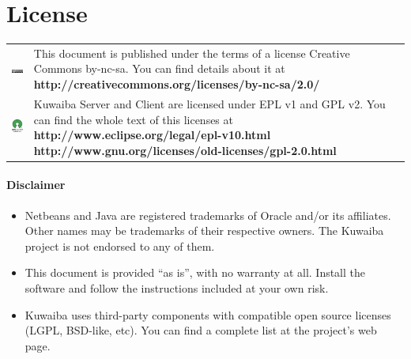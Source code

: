 \documentclass[a4paper]{article}
\begin{document}
	\section{License}
		\begin{table}[ht]
			\centering
			\begin{tabular}{cp{10cm}}
				
				\includegraphics[]{img/cc_license_logo.jpg} & This document is published under the terms of a license Creative Commons by-nc-sa. You can find details about it at\linebreak
				\textbf{http://creativecommons.org/licenses/by-nc-sa/2.0/ } \\

				\includegraphics[width=2cm]{img/osi_logo.jpg} & Kuwaiba Server and Client are licensed under EPL v1 and GPL v2. You can find the whole text of this licenses at \linebreak
				\textbf{http://www.eclipse.org/legal/epl-v10.html} \linebreak
				\textbf{http://www.gnu.org/licenses/old-licenses/gpl-2.0.html} \\
			\end{tabular}
		\end{table}
		\paragraph{Disclaimer} \hspace{0pt}
		\begin{itemize}
			\item Netbeans and Java are registered trademarks of Oracle and/or its affiliates. Other names may be trademarks of their respective owners. The Kuwaiba project is not endorsed to any of them.
			
			\item This document is provided “as is”, with no warranty at all. Install the software and follow the instructions included at your own risk.
			
			\item Kuwaiba uses third-party components with compatible open source licenses (LGPL, BSD-like, etc). You can find a complete list at the project's web page.
		\end{itemize}
	
\end{document}

